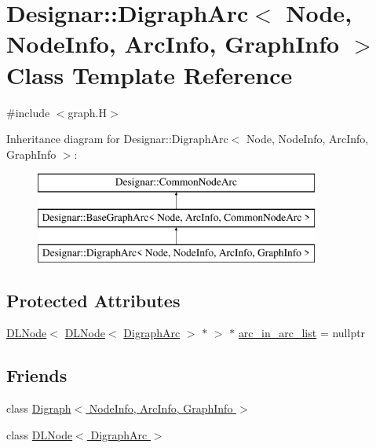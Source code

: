 \hypertarget{class_designar_1_1_digraph_arc}{}\section{Designar\+:\+:Digraph\+Arc$<$ Node, Node\+Info, Arc\+Info, Graph\+Info $>$ Class Template Reference}
\label{class_designar_1_1_digraph_arc}


{\ttfamily \#include $<$graph.\+H$>$}

Inheritance diagram for Designar\+:\+:Digraph\+Arc$<$ Node, Node\+Info, Arc\+Info, Graph\+Info $>$\+:\begin{figure}[H]
\begin{center}
\leavevmode
\includegraphics[height=3.000000cm]{class_designar_1_1_digraph_arc}
\end{center}
\end{figure}
\subsection*{Protected Attributes}
\begin{DoxyCompactItemize}
\item 
\hyperlink{class_designar_1_1_d_l_node}{D\+L\+Node}$<$ \hyperlink{class_designar_1_1_d_l_node}{D\+L\+Node}$<$ \hyperlink{class_designar_1_1_digraph_arc}{Digraph\+Arc} $>$ $\ast$ $>$ $\ast$ \hyperlink{class_designar_1_1_digraph_arc_a1b269dc44c4b3696cb79e86a97afbdd7}{arc\+\_\+in\+\_\+arc\+\_\+list} = nullptr
\end{DoxyCompactItemize}
\subsection*{Friends}
\begin{DoxyCompactItemize}
\item 
class \hyperlink{class_designar_1_1_digraph_arc_abc8f370e4ec7084a6574cf967a5a5aaf}{Digraph$<$ Node\+Info, Arc\+Info, Graph\+Info $>$}
\item 
class \hyperlink{class_designar_1_1_digraph_arc_a1d0cecb0e630aa2aa8179b2afdd92a8b}{D\+L\+Node$<$ Digraph\+Arc $>$}
\end{DoxyCompactItemize}
